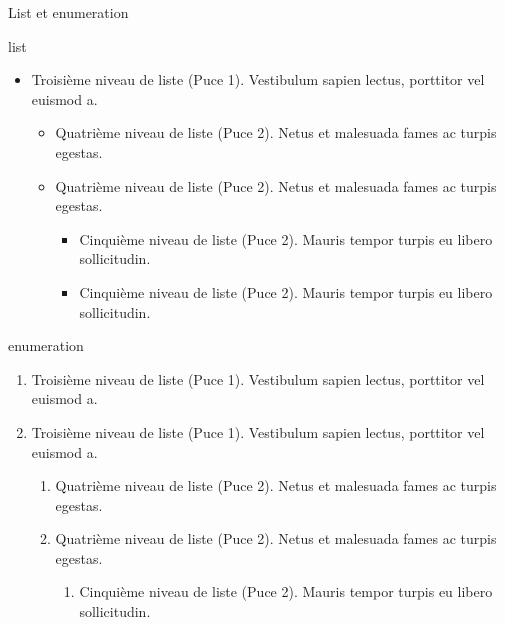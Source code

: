 \begin{frame}{List et enumeration}
   \begin{block}{list}
      \begin{itemize}
         \item Troisième niveau de liste (Puce 1). Vestibulum sapien lectus, porttitor vel euismod a.
         \begin{itemize}
            \item Quatrième niveau de liste (Puce 2). Netus et malesuada fames ac turpis egestas.
            \item Quatrième niveau de liste (Puce 2). Netus et malesuada fames ac turpis egestas.
            \begin{itemize}
               \item Cinquième niveau de liste (Puce 2). Mauris tempor turpis eu libero sollicitudin.
               \item Cinquième niveau de liste (Puce 2). Mauris tempor turpis eu libero sollicitudin.
            \end{itemize}
          \end{itemize}
        \end{itemize}
   \end{block}

   \begin{block}{enumeration}
      \begin{enumerate}
         \item Troisième niveau de liste (Puce 1). Vestibulum sapien lectus, porttitor vel euismod a.
         \item Troisième niveau de liste (Puce 1). Vestibulum sapien lectus, porttitor vel euismod a.
         \begin{enumerate}
            \item Quatrième niveau de liste (Puce 2). Netus et malesuada fames ac turpis egestas.
            \item Quatrième niveau de liste (Puce 2). Netus et malesuada fames ac turpis egestas.
            \begin{enumerate}
               \item Cinquième niveau de liste (Puce 2). Mauris tempor turpis eu libero sollicitudin.
            \end{enumerate}
          \end{enumerate}
        \end{enumerate}
   \end{block}
\end{frame}

